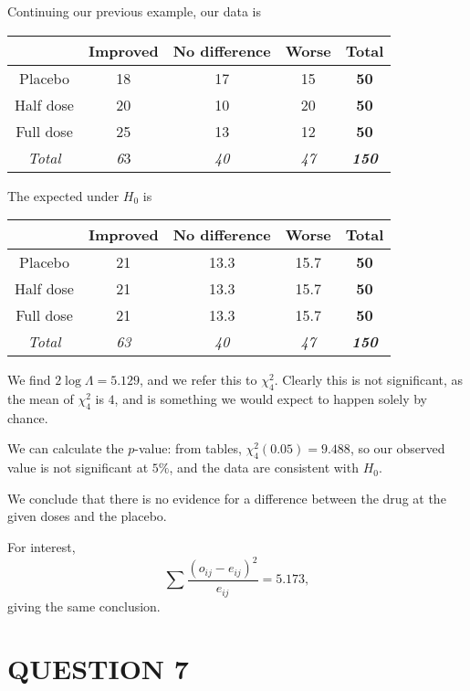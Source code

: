 \documentclass[a4paper]{article}
\begin{document}
Continuing our previous example, our data is
\begin{center}
	\begin{tabular}{ccccc}
		\toprule
		& Improved & No difference & Worse & \textbf{Total}\\\midrule
		Placebo & 18 & 17 & 15 & \textbf{50} \\
		Half dose & 20 & 10 & 20 & \textbf{50} \\
		Full dose & 25 & 13 & 12& \textbf{50} \\\midrule
		\textit{Total} & \textit{6}3 & \textit{40} & \textit{47} & \textbf{\textit{150}} \\ \bottomrule
	\end{tabular}
\end{center}
The expected under $H_0$ is
\begin{center}
	\begin{tabular}{ccccc}
		\toprule
		& Improved & No difference & Worse &\textbf{Total}\\\midrule
		Placebo & 21 & 13.3 & 15.7 & \textbf{50} \\
		Half dose & 21 & 13.3 & 15.7 & \textbf{50}\\
		Full dose & 21 & 13.3 & 15.7 & \textbf{50}\\\midrule
		\textit{Total}& \textit{63} & \textit{40} & \textit{47} & \textbf{\textit{150}}\\ \bottomrule
	\end{tabular}
\end{center}
We find $2\log \Lambda = 5.129$, and we refer this to $\chi_4^2$. Clearly this is not significant, as the mean of $\chi_4^2$ is $4$, and is something we would expect to happen solely by chance.

We can calculate the $p$-value: from tables, $\chi_4^2(0.05) = 9.488$, so our observed value is not significant at $5\%$, and the data are consistent with $H_0$.

We conclude that there is no evidence for a difference between the drug at the given doses and the placebo.

For interest,
\[
\sum\frac{(o_{ij} - e_{ij})^2}{e_{ij}} = 5.173,
\]
giving the same conclusion.





\section{QUESTION 7}
\end{document}
